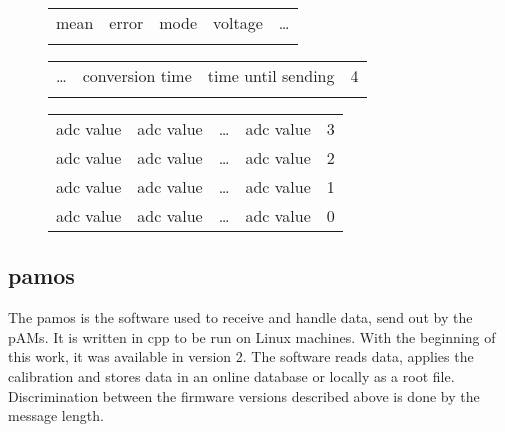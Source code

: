 \begin{figure}
	\centering
	\begin{tabular}{|C{4cm}|C{4cm}|C{1cm}|C{1cm}|C{1cm}}
		mean & error & mode & voltage & \dots \\
	\end{tabular}
	\begin{tabular}{C{1cm}|C{4cm}|C{4cm}|C{1cm}|}
	\dots & conversion time & time until sending & 4\\
	\end{tabular}
	\begin{tabular}{|C{2cm}|C{2cm}|C{3cm}|C{2cm}|C{1cm}|}
	\ac{adc} value & \ac{adc} value & \dots &\ac{adc} value & 3\\
	\ac{adc} value & \ac{adc} value & \dots &\ac{adc} value & 2\\
	\ac{adc} value & \ac{adc} value & \dots &\ac{adc} value & 1\\
	\ac{adc} value & \ac{adc} value & \dots &\ac{adc} value & 0\\
	\end{tabular}
	\label{fig:firmware:vx1:dataframe}
\end{figure} 

\subsection{\acs{pamos}}
The \acl{pamos} is the software used to receive and handle data, send out by the \acp{pAM}. It is written in \acs{cpp} to be run on Linux machines. With the beginning of this work, it was available in version 2. The software reads data, applies the calibration and stores data in an online database or locally as a root file. Discrimination between the firmware versions described above is done by the message length. 


